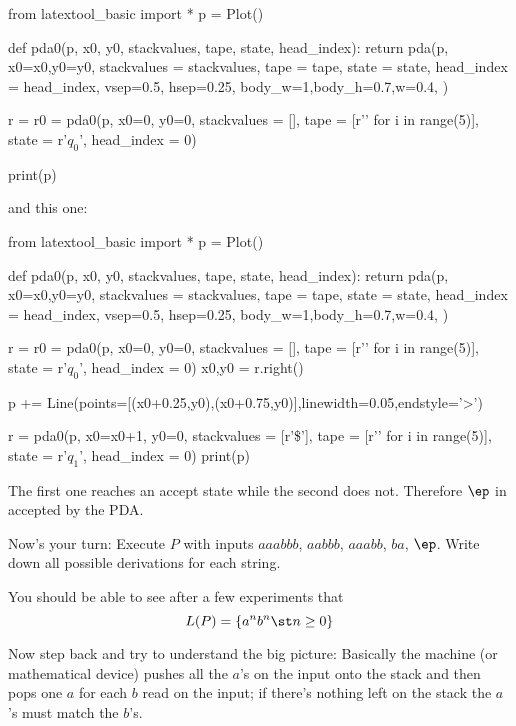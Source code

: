 \begin{python}
from latextool_basic import *
p = Plot()

def pda0(p, x0, y0, stackvalues, tape, state, head_index):
    return pda(p,
           x0=x0,y0=y0,
           stackvalues = stackvalues,
           tape = tape,
           state = state,
           head_index = head_index,
           vsep=0.5, hsep=0.25,
           body_w=1,body_h=0.7,w=0.4,
           )

r = r0 = pda0(p, x0=0, y0=0,
         stackvalues = [], tape = [r'\SPACE' for i in range(5)],
         state = r'$q_0$', head_index = 0)

print(p)
\end{python}

and this one:

\begin{python}
from latextool_basic import *
p = Plot()

def pda0(p, x0, y0, stackvalues, tape, state, head_index):
    return pda(p,
           x0=x0,y0=y0,
           stackvalues = stackvalues,
           tape = tape,
           state = state,
           head_index = head_index,
           vsep=0.5, hsep=0.25,
           body_w=1,body_h=0.7,w=0.4,
           )

r = r0 = pda0(p, x0=0, y0=0,
         stackvalues = [], tape = [r'\SPACE' for i in range(5)],
         state = r'$q_0$', head_index = 0)
x0,y0 = r.right()

p += Line(points=[(x0+0.25,y0),(x0+0.75,y0)],linewidth=0.05,endstyle='>')

r = pda0(p, x0=x0+1, y0=0,
        stackvalues = [r'\$'], tape = [r'\SPACE' for i in range(5)],
        state = r'$q_1$', head_index = 0)
print(p)
\end{python}

The first one reaches an accept state while the second does not.
Therefore $\ep$ in accepted by the PDA.

\newpage
\begin{ex}
Now's your turn: Execute $P$ with inputs $aaabbb$, $aabbb$, $aaabb$, 
$ba$, $\ep$.
Write down all possible derivations for each string.
\end{ex}


\newpage
You should be able to see after a few experiments that
\[
L(P) = \{a^n b^n \st n \geq 0\}
\]

Now step back and try to understand the big picture:
Basically the machine (or mathematical device) pushes all the $a$'s on the
input onto the stack and then pops one $a$ for each $b$ read on the input;
if there's nothing left on the stack the $a$'s must match the $b$'s.

